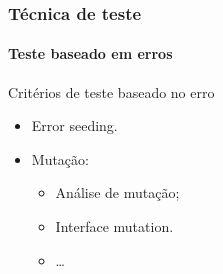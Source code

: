 \begin{frame}[hasprev=true, hasnext=false]
\frametitle{Técnica de teste}
\framesubtitle{Teste baseado em erros}
\label{concept:fault-based-test-criteria}

\begin{block:fact}{Critérios de teste baseado no erro}
\begin{itemize}
	\item Error seeding.
	\item Mutação:
	\begin{itemize}
		\item Análise de mutação;
		\item Interface mutation.
		\item \ldots
	\end{itemize}
\end{itemize}
\end{block:fact}

\hfill
{}
\end{frame}
